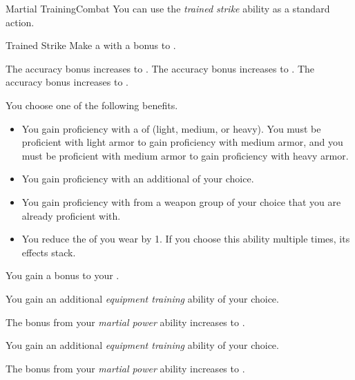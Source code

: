     \begin{feat}{Martial Training}{Combat}
         You can use the \textit{trained strike} ability as a standard action.
        \begin{freeability}{Trained Strike}
            Make a  with a  bonus to .

            \rankline
             The accuracy bonus increases to .
             The accuracy bonus increases to .
             The accuracy bonus increases to .
        \end{freeability}

         You choose one of the following benefits.
        \begin{itemize}
            \item You gain proficiency with a  of  (light, medium, or heavy).
                You must be proficient with light armor to gain proficiency with medium armor, and you must be proficient with medium armor to gain proficiency with heavy armor.
            \item You gain proficiency with an additional  of your choice.
            \item You gain proficiency with  from a weapon group of your choice that you are already proficient with.
            \item You reduce the  of  you wear by 1.
                If you choose this ability multiple times, its effects stack.
        \end{itemize}

         You gain a  bonus to your  .

         You gain an additional \textit{equipment training} ability of your choice.

         The bonus from your \textit{martial power} ability increases to .

         You gain an additional \textit{equipment training} ability of your choice.

         The bonus from your \textit{martial power} ability increases to .
    \end{feat}


